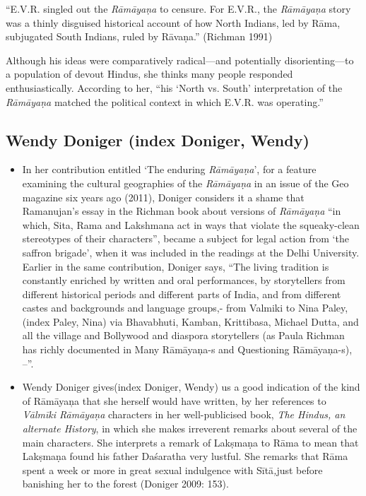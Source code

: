 \begin{myquote}
“E.V.R. singled out the \textit{Rāmāyaṇa} to censure. For E.V.R., the \textit{Rāmāyaṇa} story was a thinly disguised historical account of how North Indians, led by Rāma, subjugated South Indians, ruled by Rāvaṇa.” (Richman 1991)
\end{myquote}

Although his ideas were comparatively radical—and potentially disorienting—to a population of devout Hindus, she thinks many people responded enthusiastically. According to her, “his ‘North vs. South’ interpretation of the \textit{Rāmāyaṇa} matched the political context in which E.V.R. was operating.”


\subsection*{Wendy Doniger (index Doniger, Wendy)}

\begin{itemize}
\item In her contribution entitled ‘The enduring \textit{Rāmāyaṇa}’, for a feature examining the cultural geographies of the \textit{Rāmāyaṇa} in an issue of the Geo magazine six years ago (2011), Doniger considers it a shame that Ramanujan’s essay in the Richman book about versions of \textit{Rāmāyaṇa} “in which, Sita, Rama and Lakshmana act in ways that violate the squeaky-clean stereotypes of their characters”, became a subject for legal action from ‘the saffron brigade’, when it was included in the readings at the Delhi University. Earlier in the same contribution, Doniger says, “The living tradition is constantly enriched by written and oral performances, by storytellers from different historical periods and different parts of India, and from different castes and backgrounds and language groups,- from Valmiki to Nina Paley, (index Paley, Nina) via Bhavabhuti, Kamban, Krittibasa, Michael Dutta, and all the village and Bollywood and diaspora storytellers (as Paula Richman has richly documented in Many Rāmāyaņa-s and Questioning Rāmāyaņa-s), --”.

 \item Wendy Doniger gives(index Doniger, Wendy) us a good indication of the kind of Rāmāyaņa that she herself would have written, by her references to \textit{Vālmīki Rāmāyaņa} characters in her well-publicised book, \textit{The Hindus, an} \textit{alternate History}, in which she makes irreverent remarks about several of the main characters. She interprets a remark of Lakṣmaṇa to Rāma to mean that Lakṣmaṇa found his father Daśaratha very lustful. She remarks that Rāma spent a week or more in great sexual indulgence with Sītā\textit{,}just before banishing her to the forest (Doniger 2009: 153).

\end{itemize}


